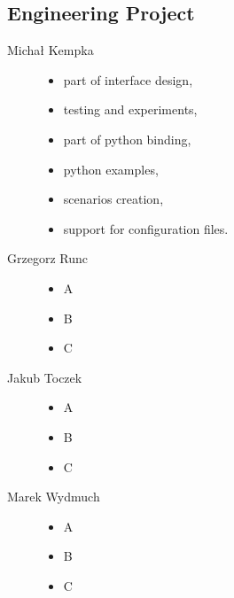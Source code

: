 	\subsection{Engineering Project}
	\begin{description}
		\item[Michał Kempka] \hfill
			\begin{itemize}
				\item part of interface design,
				\item testing and experiments,
				\item part of python binding,
				\item python examples,
				\item scenarios creation,
				\item support for configuration files.
			\end{itemize}
		\item[Grzegorz Runc] \hfill
			\begin{itemize}
				\item A
				\item B
				\item C
			\end{itemize}
		\item[Jakub Toczek] \hfill
			\begin{itemize}
				\item A
				\item B
				\item C
			\end{itemize}
		\item[Marek Wydmuch] \hfill
			\begin{itemize}
				\item A
				\item B
				\item C
			\end{itemize}
	\end{description}
	
   	
